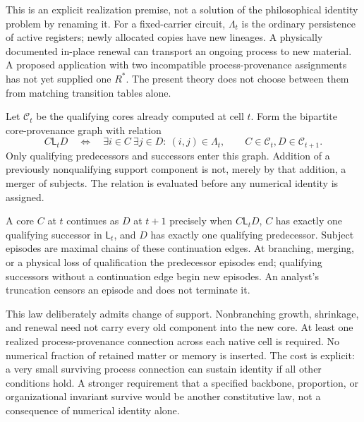 This is an explicit realization premise, not a solution of the philosophical identity problem by renaming it. For a fixed-carrier circuit, $\Lambda_t$ is the ordinary persistence of active registers; newly allocated copies have new lineages. A physically documented in-place renewal can transport an ongoing process to new material. A proposed application with two incompatible process-provenance assignments has not yet supplied one $R^\ast$. The present theory does not choose between them from matching transition tables alone.

Let $\mathcal C_t$ be the qualifying cores already computed at cell $t$. Form the bipartite core-provenance graph with relation
\begin{equation}\label{eq:core-provenance}
 C\mathrel{\mathsf L_t}D
 \quad\Longleftrightarrow\quad
 \exists i\in C\ \exists j\in D:\ (i,j)\in\Lambda_t,
 \qquad C\in\mathcal C_t, D\in\mathcal C_{t+1}.
\end{equation}
Only qualifying predecessors and successors enter this graph. Addition of a previously nonqualifying support component is not, merely by that addition, a merger of subjects. The relation is evaluated before any numerical identity is assigned.

\begin{constitution}\label{ax:A3}
A core $C$ at $t$ continues as $D$ at $t+1$ precisely when $C\mathsf L_tD$, $C$ has exactly one qualifying successor in $\mathsf L_t$, and $D$ has exactly one qualifying predecessor. Subject episodes are maximal chains of these continuation edges. At branching, merging, or a physical loss of qualification the predecessor episodes end; qualifying successors without a continuation edge begin new episodes. An analyst's truncation censors an episode and does not terminate it.
\end{constitution}

This law deliberately admits change of support. Nonbranching growth, shrinkage, and renewal need not carry every old component into the new core. At least one realized process-provenance connection across each native cell is required. No numerical fraction of retained matter or memory is inserted. The cost is explicit: a very small surviving process connection can sustain identity if all other conditions hold. A stronger requirement that a specified backbone, proportion, or organizational invariant survive would be another constitutive law, not a consequence of numerical identity alone.

